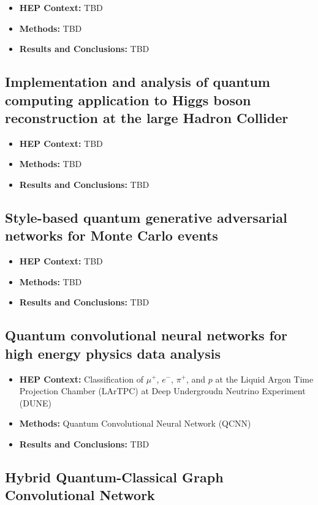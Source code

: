 \begin{itemize}
	\item \textbf{HEP Context: }TBD
	\item \textbf{Methods: }TBD
	\item \textbf{Results and Conclusions: }TBD
\end{itemize}\subsection{Implementation and analysis of quantum computing application to Higgs boson reconstruction at the large Hadron Collider~\cite{AlexiadesArmenakas:2021lrs}}
\begin{itemize}
	\item \textbf{HEP Context: }TBD
	\item \textbf{Methods: }TBD
	\item \textbf{Results and Conclusions: }TBD
\end{itemize}\subsection{Style-based quantum generative adversarial networks for Monte Carlo events~\cite{Bravo-Prieto:2021ehz}}
\begin{itemize}
	\item \textbf{HEP Context: }TBD
	\item \textbf{Methods: }TBD
	\item \textbf{Results and Conclusions: }TBD
\end{itemize}\subsection{Quantum convolutional neural networks for high energy physics data analysis~\cite{Chen:2020zkj}}
\begin{itemize}
	\item \textbf{HEP Context: }Classification of $\mu^+$, $e^-$, $\pi^+$, and $p$ at the Liquid Argon Time Projection Chamber (LArTPC) at Deep Undergroudn Neutrino Experiment (DUNE)
	\item \textbf{Methods: }Quantum Convolutional Neural Network (QCNN)
	\item \textbf{Results and Conclusions: }TBD
\end{itemize}\subsection{Hybrid Quantum-Classical Graph Convolutional Network~\cite{Chen:2021ouz}}
